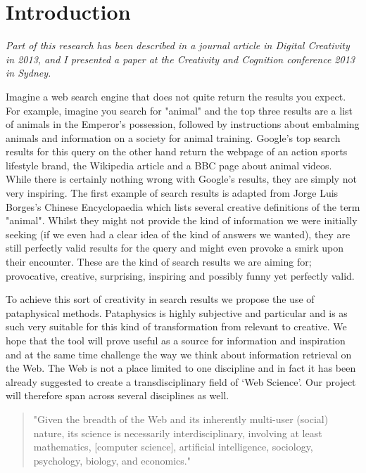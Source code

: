 
\chapter{Introduction}
\label{ch:intro}

\emph{Part of this research has been described in a journal article in Digital Creativity in 2013, and I presented a paper at the Creativity and Cognition conference 2013 in Sydney.}

\grule

Imagine a web search engine that does not quite return the results you expect. For example, imagine you search for "animal" and the top three results are a list of animals in the Emperor's possession, followed by instructions about embalming animals and information on a society for animal training. Google's top search results for this query on the other hand return the webpage of an action sports lifestyle brand, the Wikipedia article and a BBC page about animal videos. While there is certainly nothing wrong with Google's results, they are simply not very inspiring. The first example of search results is adapted from Jorge Luis Borges's Chinese Encyclopaedia \citep{Borges2000}  which lists several creative definitions of the term "animal". Whilst they might not provide the kind of information we were initially seeking (if we even had a clear idea of the kind of answers we wanted), they are still perfectly valid results for the query and might even provoke a smirk upon their encounter. These are the kind of search results we are aiming for; provocative, creative, surprising, inspiring and possibly funny yet perfectly valid.

To achieve this sort of creativity in search results we propose the use of pataphysical methods. Pataphysics is highly subjective and particular and is as such very suitable for this kind of transformation from relevant to creative. We hope that the tool will prove useful as a source for information and inspiration and at the same time challenge the way we think about information retrieval on the Web. The Web is not a place limited to one discipline and in fact it has been already suggested to create a transdisciplinary field of ‘Web Science'. Our project will therefore span across several disciplines as well.

\begin{quote}
  "Given the breadth of the Web and its inherently multi-user (social) nature, its science is necessarily interdisciplinary, involving at least mathematics, [computer science], artificial intelligence, sociology, psychology, biology, and economics." \citep{Hendler2008}
\end{quote}

